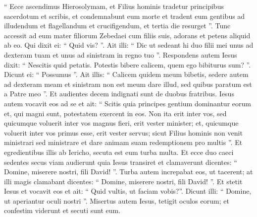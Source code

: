 \begin{biblechapter}
\begin{biblechapter}
\begin{biblechapter}
\begin{biblechapter}
\begin{biblechapter}
\begin{biblechapter}
\begin{biblechapter}
\begin{biblechapter}
\begin{biblechapter}
\begin{biblechapter}
\begin{biblechapter}
\begin{biblechapter}
\begin{biblechapter}
\begin{biblechapter}
\begin{biblechapter}
\begin{biblechapter}
\begin{biblechapter}
\begin{biblechapter}
\begin{biblechapter}
\begin{biblechapter}
\verse “ Ecce ascendimus Hierosolymam, et Filius hominis tradetur principibus sacerdotum et scribis, et condemnabunt eum morte 
\verse et tradent eum gentibus ad illudendum et flagellandum et crucifigendum, et tertia die resurget ”.
 \verse Tunc accessit ad eum mater filiorum Zebedaei cum filiis suis, adorans et petens aliquid ab eo. 
\verse Qui dixit ei: “ Quid vis? ”. Ait illi: “ Dic ut sedeant hi duo filii mei unus ad dexteram tuam et unus ad sinistram in regno tuo ”. 
\verse Respondens autem Iesus dixit: “ Nescitis quid petatis. Potestis bibere calicem, quem ego bibiturus sum? ”. Dicunt ei: “ Possumus ”. 
\verse Ait illis: “ Calicem quidem meum bibetis, sedere autem ad dexteram meam et sinistram non est meum dare illud, sed quibus paratum est a Patre meo ”.
 \verse Et audientes decem indignati sunt de duobus fratribus. 
\verse Iesus autem vocavit eos ad se et ait: “ Scitis quia principes gentium dominantur eorum et, qui magni sunt, potestatem exercent in eos. 
\verse Non ita erit inter vos, sed quicumque voluerit inter vos magnus fieri, erit vester minister; 
\verse et, quicumque voluerit inter vos primus esse, erit vester servus; 
\verse sicut Filius hominis non venit ministrari sed ministrare et dare animam suam redemptionem pro multis ”.
 \verse Et egredientibus illis ab Iericho, secuta est eum turba multa. 
\verse Et ecce duo caeci sedentes secus viam audierunt quia Iesus transiret et clamaverunt dicentes: “ Domine, miserere nostri, fili David! ”. 
\verse Turba autem increpabat eos, ut tacerent; at illi magis clamabant dicentes: “ Domine, miserere nostri, fili David! ”. 
\verse Et stetit Iesus et vocavit eos et ait: “ Quid vultis, ut faciam vobis?”. 
\verse Dicunt illi: “ Domine, ut aperiantur oculi nostri ”. 
\verse Misertus autem Iesus, tetigit oculos eorum; et confestim viderunt et secuti sunt eum.
 

\end{biblechapter}
\end{biblechapter}
\end{biblechapter}
\end{biblechapter}
\end{biblechapter}
\end{biblechapter}
\end{biblechapter}
\end{biblechapter}
\end{biblechapter}
\end{biblechapter}
\end{biblechapter}
\end{biblechapter}
\end{biblechapter}
\end{biblechapter}
\end{biblechapter}
\end{biblechapter}
\end{biblechapter}
\end{biblechapter}
\end{biblechapter}
\end{biblechapter}

